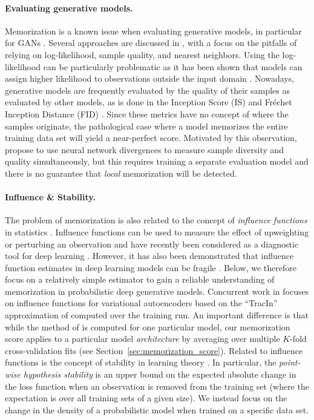 \documentclass{article}
\begin{document}
\paragraph{Evaluating generative models.} Memorization is a known issue when  
evaluating generative models, in particular for GANs  
\cite{arora2018do,xu2018empirical}. Several approaches are discussed in 
\cite{theis2016note}, with a focus on the pitfalls of relying on 
log-likelihood, sample quality, and nearest neighbors. Using the 
log-likelihood can be particularly problematic as it has been shown that 
models can assign higher likelihood to observations outside the input domain 
\cite{nalisnick2019deep}.  Nowadays, generative models are frequently 
evaluated by the quality of their samples as evaluated by other models, as is 
done in the Inception Score (IS) \cite{salimans2016improved} and Fr\'echet 
Inception Distance (FID) \cite{heusel2017gans}. Since these metrics have no 
concept of where the samples originate, the pathological case where a model 
memorizes the entire training data set will yield a near-perfect score.  
Motivated by this observation, \cite{gulrajani2018towards} propose to use 
neural network divergences to measure sample diversity and quality 
simultaneously, but this requires training a separate evaluation model and 
there is no guarantee that \emph{local} memorization will be detected.

\paragraph{Influence \& Stability.} The problem of memorization is also 
related to the concept of \emph{influence functions} in statistics 
\cite{hampel1974influence,cook1980characterizations}. Influence functions can 
be used to measure the effect of upweighting or perturbing an observation and 
have recently been considered as a diagnostic tool for deep learning 
\cite{koh2017understanding,terashita2021influence}.  However, it has also been 
demonstrated that influence function estimates in deep learning models can be 
fragile \cite{basu2021influence}. Below, we therefore focus on a relatively 
simple estimator to gain a reliable understanding of memorization in 
probabilistic deep generative models. Concurrent work in 
\cite{kong2021understanding} focuses on influence functions for variational 
autoencoders based on the ``TracIn'' approximation of 
\cite{pruthi2020estimating} computed over the training run. An important 
difference is that while the method of \cite{kong2021understanding} is 
computed for one particular model, our memorization score applies to a 
particular model \emph{architecture} by averaging over multiple $K$-fold 
cross-validation fits (see Section~\ref{sec:memorization_score}). Related to 
influence functions is the concept of stability in learning theory 
\cite{bousquet2002stability}. In particular, the \emph{point-wise hypothesis 
	stability} is an upper bound on the expected absolute change in the 
loss function when an observation is removed from the training set (where the 
expectation is over all training sets of a given size). We instead focus on 
the change in the density of a probabilistic model when trained on a specific 
data set.
\end{document}
